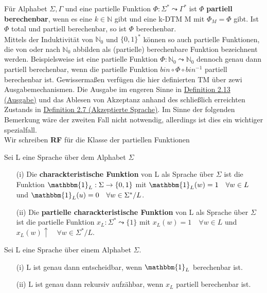   Für Alphabet \(\Sigma, \Gamma\) und eine partielle Funktion \(\Phi : \Sigma^* \leadsto \Gamma^*\) ist \(\Phi\) \textbf{partiell berechenbar}, wenn es eine \(k \in \mathbb{N}\) gibt und eine k-DTM M mit \(\Phi_M = \Phi\) gibt. Ist \(\Phi\) total und partiell berechenbar, so ist \(\Phi\) berechenbar.\\
  
  Mittels der Induktivität von \(\mathbb{N}_0\) und \(\{0, 1\}^*\) können so auch partielle Funktionen, die von oder nach \(\mathbb{N}_0\) abbilden als (partielle) berechenbare Funktion bezeichnent werden. Beispielsweise ist eine partielle Funktion \(\Phi : \mathbb{N}_0 \leadsto \mathbb{N}_0\) dennoch genau dann partiell berechenbar, wenn die partielle Funktion \(bin \circ \Phi \circ bin^{-1}\) partiell berechenbar ist. Gewissermaßen verfügen die hier definierten TM über zewi Ausgabemechanismen. Die Ausgabe im engeren Sinne in \hyperref[subsec:2.13]{Definition 2.13 (Ausgabe)} und das Ablesen von Akzeptanz anhand des schließlich erreichten Zustands in \hyperref[subsec:2.7]{Definition 2.7 (Akzeptierte Sprache)}. Im Sinne der folgenden Bemerkung wäre der zweiten Fall nicht notwendig, allerdings ist dies ein wichtiger spezialfall.\\

  Wir schreiben \textbf{RF} für die Klasse der partiellen Funktionen

  Sei L eine Sprache über dem Alphabet \(\Sigma\)
  \begin{itemize}
    \item [(i)] Die \textbf{charackteristische Funktion} von L als Sprache über \(\Sigma\) ist die Funktion \(\mathbbm{1}_L : \Sigma \rightarrow \{0, 1\}\) mit \(\mathbbm{1}_L(w) = 1 \quad \forall w \in L\) und \(\mathbbm{1}_L (u) = 0 \quad \forall w \in \Sigma^* / L\).
    \item [(ii)] Die \textbf{ partielle charackteristische Funktion} von L als Sprache über \(\Sigma\) ist die partielle Funktion \(x_L : \Sigma^* \leadsto \{1\}\) mit \(x_L(w) = 1 \quad \forall w \in L\) und \(x_L(w) \uparrow \quad \forall w \in \Sigma^* / L\). 
  \end{itemize}

  Sei L eine Sprache über einem Alphabet \(\Sigma\). 
  \begin{itemize}
    \item [(i)] L ist genau dann entscheidbar, wenn \(\mathbbm{1}_L\) berechenbar ist.
    \item [(ii)] L ist genau dann rekursiv aufzähbar, wenn \(x_L\) partiell berechenbar ist.
  \end{itemize}

